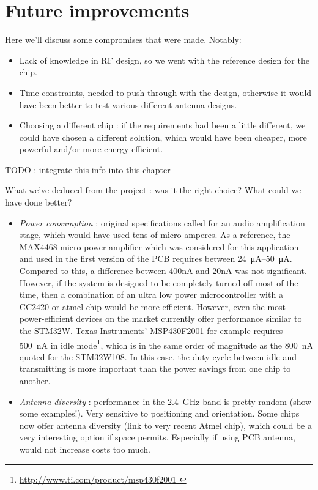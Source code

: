 \chapter{Future improvements}\label{ch:improvements}

Here we'll discuss some compromises that were made. Notably:

\begin{itemize}
  \item Lack of knowledge in RF design, so we went with the reference design for
    the chip.
  \item Time constraints, needed to push through with the design, otherwise it
    would have been better to test various different antenna designs. 
  \item Choosing a different chip : if the requirements had been a little
    different, we could have chosen a different solution, which would have been
    cheaper, more powerful and/or more energy efficient.
\end{itemize}


TODO : integrate this info into this chapter

What we've deduced from the project : was it the right choice? What could we
have done better?

\begin{itemize}
  \item \emph{Power consumption} : original specifications called for an audio
    amplification stage, which would have used tens of micro amperes. As
    a reference, the MAX4468 micro power amplifier which was considered for this
    application and used in the first version of the PCB requires between
    \SIrange{24}{50}{\micro\ampere}. Compared to this, a difference between
    400nA and 20nA was not significant. However, if the system is designed to be
    completely turned off most of the time, then a combination of an ultra low
    power microcontroller with a CC2420 or atmel chip would be more efficient.
    However, even the most power-efficient devices on the market currently offer
    performance similar to the STM32W. Texas Instruments' MSP430F2001 for
    example requires \SI{500}{nA} in idle mode\footnote{ \url{
    http://www.ti.com/product/msp430f2001 }}, which is in the same order of
    magnitude as the \SI{800}{nA} quoted for the STM32W108. In this case, the
    duty cycle between idle and transmitting is more important than the power
    savings from one chip to another.
  \item \emph{Antenna diversity} : performance in the \SI{2.4}{GHz} band is pretty
    random (show some examples!). Very sensitive to positioning and orientation.
    Some chips now offer antenna diversity (link to very recent Atmel chip),
    which could be a very interesting option if space permits. Especially if
    using PCB antenna, would not increase costs too much.
\end{itemize}

